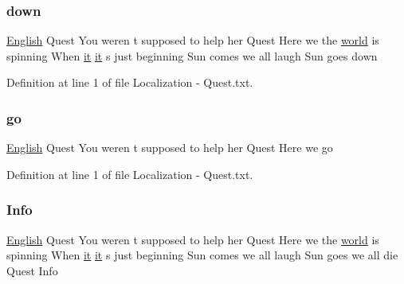 \subsubsection{\texorpdfstring{down}{down}}
{\footnotesize\ttfamily \mbox{\hyperlink{_sphere_i_i_01_winter_01_project_2_config_2_localization_8txt_ad896b63205779b1b09e86d941ce13976}{English}} Quest You weren t supposed to help her Quest Here we the \mbox{\hyperlink{_sphere_i_i_01_music_01_boxes_2_config_2_localization_8txt_a7ede01351426b1b7f6c1ce5f794e474f}{world}} is spinning When \mbox{\hyperlink{_the_01_restless_01_curse_2_config_2_localization_01-_01_quest_8txt_a741b285909bea4855b886664c2dcd50c}{it}} \mbox{\hyperlink{_the_01_restless_01_curse_2_config_2_localization_01-_01_quest_8txt_a741b285909bea4855b886664c2dcd50c}{it}} s just beginning Sun comes we all laugh Sun goes down}



Definition at line 1 of file Localization -\/ Quest.\+txt.

\mbox{\label{_the_01_restless_01_curse_2_config_2_localization_01-_01_quest_8txt_a4c722a67215ed48eaf39d59a560b5d1c}} 
\subsubsection{\texorpdfstring{go}{go}}
{\footnotesize\ttfamily \mbox{\hyperlink{_sphere_i_i_01_winter_01_project_2_config_2_localization_8txt_ad896b63205779b1b09e86d941ce13976}{English}} Quest You weren t supposed to help her Quest Here we go}



Definition at line 1 of file Localization -\/ Quest.\+txt.

\mbox{\label{_the_01_restless_01_curse_2_config_2_localization_01-_01_quest_8txt_abb68e52d696d925afb927a05387d9ea2}} 
\subsubsection{\texorpdfstring{Info}{Info}}
{\footnotesize\ttfamily \mbox{\hyperlink{_sphere_i_i_01_winter_01_project_2_config_2_localization_8txt_ad896b63205779b1b09e86d941ce13976}{English}} Quest You weren t supposed to help her Quest Here we the \mbox{\hyperlink{_sphere_i_i_01_music_01_boxes_2_config_2_localization_8txt_a7ede01351426b1b7f6c1ce5f794e474f}{world}} is spinning When \mbox{\hyperlink{_the_01_restless_01_curse_2_config_2_localization_01-_01_quest_8txt_a741b285909bea4855b886664c2dcd50c}{it}} \mbox{\hyperlink{_the_01_restless_01_curse_2_config_2_localization_01-_01_quest_8txt_a741b285909bea4855b886664c2dcd50c}{it}} s just beginning Sun comes we all laugh Sun goes we all die Quest Info}



